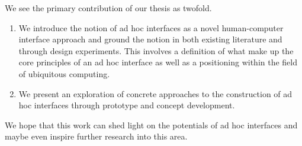 We see the primary contribution of our thesis as twofold.

\begin{enumerate}
\item{We introduce the notion of ad hoc interfaces as a novel human-computer interface approach and ground the notion in both existing literature and through design experiments. 
This involves a definition of what make up the core principles of an ad hoc interface as well as a positioning within the field of ubiquitous computing.}

\item{We present an exploration of concrete approaches to the construction of ad hoc interfaces through prototype and concept development.}
\end{enumerate}
We hope that this work can shed light on the potentials of ad hoc interfaces and maybe even inspire further research into this area.
